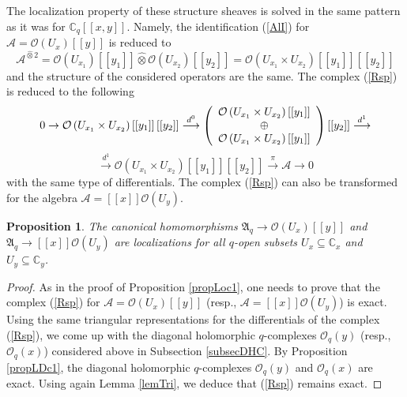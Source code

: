\documentclass[12pt,reqno]{amsart}%
\theoremstyle{plain}
\newtheorem{proposition}{Proposition}
\numberwithin{theorem}{section} \numberwithin{equation}{section}
\numberwithin{lemma}{section}
\numberwithin{remark}{section}
\numberwithin{example}{section}
\numberwithin{proposition}{section}
\numberwithin{definition}{section}
\numberwithin{corollary}{section}
\begin{document}
The localization property of these structure sheaves is solved in the same
pattern as it was for $\mathbb{C}_{q}\left[  \left[  x,y\right]  \right]  $.
Namely, the identification (\ref{AlI}) for $\mathcal{A}=\mathcal{O}\left(
U_{x}\right)  \left[  \left[  y\right]  \right]  $ is reduced to
\[
\mathcal{A}^{\widehat{\otimes}2}=\mathcal{O}\left(  U_{x_{1}}\right)  \left[
\left[  y_{1}\right]  \right]  \widehat{\otimes}\mathcal{O}\left(  U_{x_{2}%
}\right)  \left[  \left[  y_{2}\right]  \right]  =\mathcal{O}\left(  U_{x_{1}%
}\times U_{x_{2}}\right)  \left[  \left[  y_{1}\right]  \right]  \left[
\left[  y_{2}\right]  \right]
\]
and the structure of the considered operators are the same. The complex
(\ref{Rsp}) is reduced to the following
\[
0\rightarrow\mathcal{O}\left(  U_{x_{1}}\times U_{x_{2}}\right)  \left[
\left[  y_{1}\right]  \right]  \left[  \left[  y_{2}\right]  \right]
\overset{d^{0}}{\longrightarrow}\left(
\begin{array}
[c]{c}%
\mathcal{O}\left(  U_{x_{1}}\times U_{x_{2}}\right)  \left[  \left[
y_{1}\right]  \right] \\
\oplus\\
\mathcal{O}\left(  U_{x_{1}}\times U_{x_{2}}\right)  \left[  \left[
y_{1}\right]  \right]
\end{array}
\right)  \left[  \left[  y_{2}\right]  \right]  \overset{d^{1}%
}{\longrightarrow}%
\]%
\[
\overset{d^{1}}{\longrightarrow}\mathcal{O}\left(  U_{x_{1}}\times U_{x_{2}%
}\right)  \left[  \left[  y_{1}\right]  \right]  \left[  \left[  y_{2}\right]
\right]  \overset{\pi}{\longrightarrow}\mathcal{A}\rightarrow0
\]
with the same type of differentials. The complex (\ref{Rsp}) can also be
transformed for the algebra $\mathcal{A}=\left[  \left[  x\right]  \right]
\mathcal{O}\left(  U_{y}\right)  $.

\begin{proposition}
\label{propLoc2}The canonical homomorphisms $\mathfrak{A}_{q}\rightarrow
\mathcal{O}\left(  U_{x}\right)  \left[  \left[  y\right]  \right]  $ and
$\mathfrak{A}_{q}\rightarrow\left[  \left[  x\right]  \right]  \mathcal{O}%
\left(  U_{y}\right)  $ are localizations for all $q$-open subsets
$U_{x}\subseteq\mathbb{C}_{x}$ and $U_{y}\subseteq\mathbb{C}_{y}$.
\end{proposition}

\begin{proof}
As in the proof of Proposition \ref{propLoc1}, one needs to prove that the
complex (\ref{Rsp}) for $\mathcal{A}=\mathcal{O}\left(  U_{x}\right)  \left[
\left[  y\right]  \right]  $ (resp., $\mathcal{A}=\left[  \left[  x\right]
\right]  \mathcal{O}\left(  U_{y}\right)  $) is exact. Using the same
triangular representations for the differentials of the complex (\ref{Rsp}),
we come up with the diagonal holomorphic $q$-complexes $\mathcal{O}_{q}\left(
y\right)  $ (resp., $\mathcal{O}_{q}\left(  x\right)  $) considered above in
Subsection \ref{subsecDHC}. By Proposition \ref{propLDc1}, the diagonal
holomorphic $q$-complexes $\mathcal{O}_{q}\left(  y\right)  $ and
$\mathcal{O}_{q}\left(  x\right)  $ are exact. Using again Lemma \ref{lemTri},
we deduce that (\ref{Rsp}) remains exact.
\end{proof}
\end{document}
